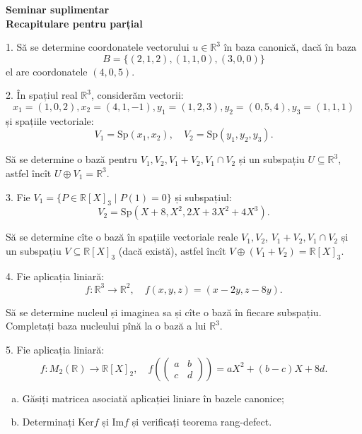 \documentclass[11pt,a4paper]{article}
\newcommand\seq{\subseteq}
\newcommand\RR{\mathbb{R}}
\theoremstyle{dotless}
\theoremstyle{dotlessdr}
\begin{document}
\begin{center}
  {\large\textbf{Seminar suplimentar \\ Recapitulare pentru parțial}}
\end{center}

\vspace{1cm}

1. Să se determine coordonatele vectorului $u \in \RR^3$ în baza canonică,
dacă în baza
\[
  B = \{ (2, 1, 2), (1, 1, 0), (3, 0, 0) \}
\]
el are coordonatele $(4, 0, 5)$.

\vspace{1cm}

2. În spațiul real $\RR^3$, considerăm vectorii:
\[
  x_1 = (1, 0, 2), x_2 = (4, 1, -1), y_1 = (1, 2, 3), y_2 = (0, 5, 4), %
  y_3 = (1, 1, 1)
\]
și spațiile vectoriale:
\[
  V_1 = \mathrm{Sp}(x_1, x_2), \quad V_2 = \mathrm{Sp}(y_1, y_2, y_3).
\]

Să se determine o bază pentru $V_1, V_2, V_1 + V_2, V_1 \cap V_2$ și
un subspațiu $U \seq \RR^3$, astfel încît $U \oplus V_1 = \RR^3$.

\vspace{1cm}

3. Fie $V_1 = \{ P \in \RR[X]_3 \mid P(1) = 0 \}$ și subspațiul:
\[
  V_2 = \mathrm{Sp}(X + 8, X^2, 2X + 3X^2 + 4X^3).
\]

Să se determine cîte o bază în spațiile vectoriale reale $V_1, V_2$,
$V_1 + V_2, V_1 \cap V_2$ și un subspațiu $V \seq \RR[X]_3$ (dacă există),
astfel încît $V \oplus (V_1 + V_2) = \RR[X]_3$.

\vspace{1cm}

4. Fie aplicația liniară:
\[
  f : \RR^3 \to \RR^2, \quad f(x, y, z) = (x - 2y, z - 8y).
\]

Să se determine nucleul și imaginea sa și cîte o bază în fiecare subspațiu.
Completați baza nucleului pînă la o bază a lui $\RR^3$.

\vspace{1cm}

5. Fie aplicația liniară:
\[
  f : M_2(\RR) \to \RR[X]_2, \quad %
  f(\begin{pmatrix}
    a & b \\
    c & d
  \end{pmatrix}) = aX^2 + (b - c)X + 8d.
\]

\begin{enumerate}[(a)]
\item Găsiți matricea asociată aplicației liniare în bazele canonice;
\item Determinați $\mathrm{Ker}f$ și $\mathrm{Im}f$ și verificați teorema
  rang-defect.
\end{enumerate}
\end{document}
